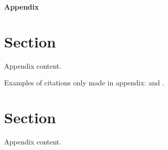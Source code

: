 \newpage
\begin{appendices}
	
\setcounter{page}{1}										%
\setcounter{footnote}{0}									%
\renewcommand{\thetable}{\thesection.\arabic{table}}		%
\renewcommand{\thefigure}{\thesection.\arabic{figure}}		%
\renewcommand{\theequation}{\thesection.\arabic{equation}}	%

\begin{center}
	{\LARGE\textbf{Appendix} \\ \vspace{0.3cm}
	}
\end{center}


\section{Section} %
\vspace{0.7cm}
\iftoggle{toclinks}{\gototoc}{} 							%
\iftoggle{cboxes}{	   				  						%
	\begin{boxeditems}
		\item To-do list.
	\end{boxeditems}}{}
\setcounter{table}{0}
\setcounter{figure}{0}
\setcounter{equation}{0}

Appendix content.



Examples of citations only made in appendix: \textcite{ChangLi:2017AER} and \parencite{ChangLi:2017AER}.


\section{Section} %
\vspace{0.7cm}
\iftoggle{toclinks}{\gototoc}{} 							%
\iftoggle{cboxes}{	   				  						%
	\begin{boxeditems}
		\item To-do list.
	\end{boxeditems}}{}
\setcounter{table}{0}
\setcounter{figure}{0}
\setcounter{equation}{0}

Appendix content.







\end{appendices}